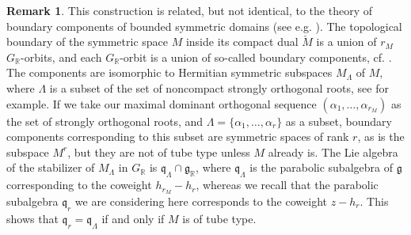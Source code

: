 \documentclass[10pt]{article}
\theoremstyle{definition}
\newtheorem{remark}[theorem]{Remark}
\numberwithin{equation}{section}
\begin{document}
\begin{remark}
This construction is related, but not identical, to the theory of boundary components of bounded symmetric domains (see e.g. \cite{jep93Wol72,jep93PS69,jep93Sat80,jep93AMRT10}). The topological boundary of the symmetric space $M$ inside its compact dual $\check M$ is a union of $r_M$ $G_{\mathbb R}$-orbits, and each $G_{\mathbb R}$-orbit is a union of so-called boundary components, cf. \cite[Def.~3.2 p.~127]{jep93AMRT10}. The components are isomorphic to Hermitian symmetric subspaces $M_\Lambda$ of $M$, where $\Lambda$ is a subset of the set of noncompact strongly orthogonal roots, see \cite[Th.~3.3 p.~127]{jep93AMRT10} for example. If we take our maximal dominant orthogonal sequence $(\alpha_1,\ldots,\alpha_{r_M})$ as the set of strongly orthogonal roots, and $\Lambda=\{\alpha_1,\ldots,\alpha_r\}$ as a subset, boundary components corresponding to this subset are symmetric spaces of rank $r$, as is the subspace $M^r$, but they are not of tube type unless $M$ already is. The Lie algebra of the stabilizer of $M_\Lambda$ in $G_{\mathbb R}$ is $\mathfrak q_\Lambda\cap\mathfrak g_{\mathbb R}$, where $\mathfrak q_\Lambda$ is the parabolic subalgebra of $\mathfrak g$ corresponding to the coweight $h_{r_M}-h_r$, whereas we recall that the parabolic subalgebra $\mathfrak q_r$ we are considering here corresponds to the coweight $z-h_r$. This shows that $\mathfrak q_r=\mathfrak q_\Lambda$ if and only if $M$ is of tube type.
\end{remark}
\clearpage
\end{document}
